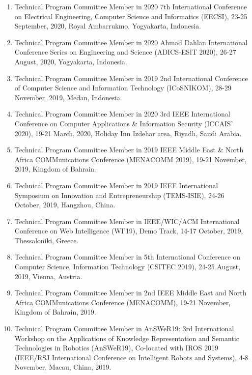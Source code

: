 \documentclass[11pt,a4paper]{moderncv}
\begin{document}
\begin{adjustwidth}{6em}{0pt}
\begin{enumerate}
		\item Technical Program Committee Member in 2020 7th International Conference on Electrical Engineering, Computer Science and Informatics (EECSI), 23-25 September, 2020, Royal Ambarrukmo, Yogyakarta, Indonesia.
		
		\item Technical Program Committee Member in 2020 Ahmad Dahlan International Conference Series on Engineering and Science (ADICS-ESIT 2020), 26-27 August, 2020, Yogyakarta, Indonesia.
		
		\item Technical Program Committee Member in 2019 2nd International Conference of Computer Science and Information Technology (ICoSNIKOM), 28-29 November, 2019, Medan, Indonesia.
		
		\item Technical Program Committee Member in 2020 3rd IEEE International Conference on Computer Applications \& Information Security (ICCAIS’ 2020), 19-21 March, 2020, Holiday Inn Izdehar area, Riyadh, Saudi Arabia.
		
		\item Technical Program Committee Member in 2019 IEEE Middle East \& North Africa COMMunications Conference (MENACOMM 2019), 19-21 November, 2019, Kingdom of Bahrain.
		
		\item Technical Program Committee Member in 2019 IEEE International Symposium on Innovation and Entrepreneurship (TEMS-ISIE), 24-26 October, 2019, Hangzhou, China.
		
		\item Technical Program Committee Member in IEEE/WIC/ACM International Conference on Web Intelligence (WI'19), Demo Track, 14-17 October, 2019, Thessaloniki, Greece.
		
		\item Technical Program Committee Member in 5th International Conference on Computer Science, Information Technology (CSITEC 2019), 24-25 August, 2019, Vienna, Austria.
		
		\item Technical Program Committee Member in 2nd IEEE Middle East and North Africa COMMunications Conference (MENACOMM), 19-21 November, Kingdom of Bahrain, 2019.
		
		\item Technical Program Committee Member in AnSWeR19: 3rd International Workshop on the Applications of Knowledge Representation and Semantic Technologies in Robotics (AnSWeR19), Co-located with IROS 2019 (IEEE/RSJ International Conference on Intelligent Robots and Systems), 4-8 November, Macau, China, 2019.
		

\end{enumerate}
\end{adjustwidth}
\end{document}
